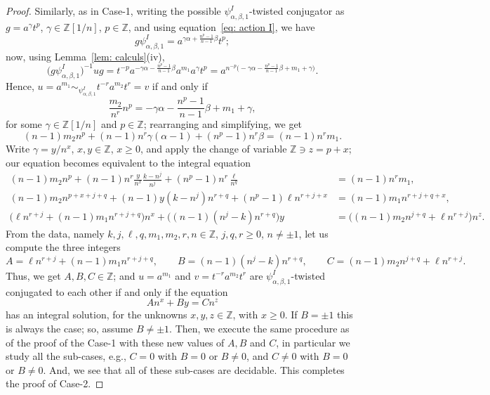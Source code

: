 \documentclass[10pt,a4paper]{amsart}
\newcommand\ZZ{\mathbb{Z}}
\begin{document}
\begin{proof}
Similarly, as in Case-1, writing the possible $\psi^I_{\alpha, \beta, 1}$-twisted conjugator as $g=a^{\gamma}t^p$, $\gamma\in \ZZ[1/n]$, $p\in \ZZ$, and using equation~\eqref{eq: action I}, we have 
 \[
g\psi^I_{\alpha,\beta, 1} =a^{\gamma \alpha + \frac{n^{p}-1}{n-1}\beta}t^{p}; 
\] 
now, using Lemma~\ref{lem: calculs}(iv),  
 \[
\big( g\psi^I_{\alpha,\beta, 1} \big)^{-1} ug=t^{-p} a^{-\gamma \alpha - \frac{n^{p}-1}{n-1}\beta} a^{m_1} a^{\gamma}t^p= a^{n^{-p}\big(-\gamma \alpha -\frac{n^p-1}{n-1}\beta +m_1 +\gamma \big)}.
 \]
Hence, $u=a^{m_1}\sim_{\psi^I_{\alpha, \beta, 1}} t^{-r}a^{m_2}t^r =v$ if and only if 
 \[
\frac{m_2}{n^{r}} n^p =-\gamma \alpha -\frac{n^{p}-1}{n-1}\beta +m_1 +\gamma, 
 \]
for some $\gamma \in \ZZ[1/n]$ and $p\in \ZZ$; rearranging and simplifying, we get
 \[
(n-1)m_2 n^p +(n-1)n^{r}\gamma (\alpha -1) +(n^{p}-1)n^{r}\beta =(n-1)n^{r}m_1.
 \]
Write $\gamma =y/n^x$, $x,y\in \ZZ$, $x\geq 0$, and apply the change of variable $\ZZ \ni z=p+x$; our equation becomes equivalent to the integral equation  
\begin{align*}
 (n-1)m_2 n^p +(n-1)n^{r}\frac{y}{n^x} \frac{k-n^j}{n^j} +(n^{p}-1)n^{r}\frac{\ell}{n^q} & =(n-1)n^{r}m_1,\\ 
 (n-1)m_2 n^{p+x+j+q} +(n-1)y(k-n^j)n^{r+q} +(n^{p}-1)\ell n^{r+j+x} &=(n-1)m_1 n^{r+j+q+x},\\
\Big( \ell n^{r+j}+(n-1)m_1 n^{r+j+q}\Big) n^x +\Big( (n-1)(n^j-k)n^{r+q} \Big) y &=\Big( (n-1)m_2 n^{j+q} +\ell n^{r+j}\Big) n^{z}. 
\end{align*}
% 
From the data, namely $k, j, \ell, q, m_1, m_2, r, n\in \ZZ$, $j,q,r\geq 0$, $n\neq \pm 1$, let us compute the three integers 
 \[
A=\ell n^{r+j}+(n-1)m_1 n^{r+j+q},\qquad B=(n-1)(n^j-k)n^{r+q}, \qquad C=(n-1)m_2 n^{j+q}+\ell n^{r+j}.
 \]
Thus, we get  $A,B,C\in \ZZ$; and $u=a^{m_1}$ and $v=t^{-r}a^{m_2}t^r$ are $\psi^I_{\alpha, \beta, 1}$-twisted conjugated to each other if and only if the equation 
 \begin{equation}\label{eq: equation-I 1}
An^x +By=Cn^z
 \end{equation}
has an integral solution, for the unknowns $x,y,z\in \ZZ$, with $x\geq 0$. If $B=\pm 1$ this is always the case; so, assume $B\neq \pm 1$. Then, we execute the same procedure as of the proof of the Case-1 with these new values of $A, B$ and $C$, in particular we study all the sub-cases, e.g., $C=0$ with $B = 0$ or $B \neq 0$, and $C \neq 0$ with $B = 0$ or $B \neq 0$. And, we see that all of these sub-cases are decidable. This completes the proof of Case-2. 
\end{proof}
\end{document}
